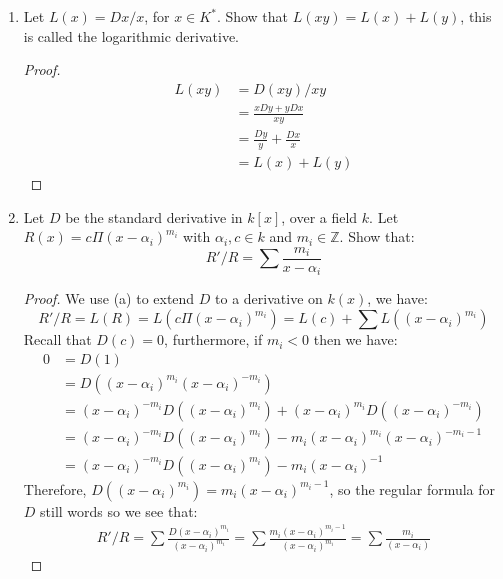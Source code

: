 \documentclass{article}
\newcommand{\Z}{\mathbb{Z}}
\theoremstyle{definition}
\theoremstyle{remark}
\theoremstyle{definition}
\begin{document}
\begin{enumerate}[label={(\alph*)}]
    \item Let $L(x)=Dx/x$, for $x\in K^\ast$. Show that $L(xy) = L(x)+L(y)$, this is called the logarithmic derivative.
    \begin{proof}
        \begin{align}
            L(xy) &= D(xy)/xy\\
                  &= \frac{xDy+yDx}{xy}\\
                  &= \frac{Dy}{y}+\frac{Dx}{x}\\
                  &= L(x)+L(y)
        \end{align}
    \end{proof}
\item Let $D$ be the standard derivative in $k[x]$, over a field $k$. Let $R(x) = c\Pi{(x-\alpha_i)}^{m_i}$ with $\alpha_i,c\in k$ and $m_i\in \Z$.
Show that:\begin{equation}
    R'/R = \sum\frac{m_i}{x-\alpha_i}
\end{equation}
\begin{proof}
    We use (a) to extend $D$ to a derivative on $k(x)$, we have:\begin{equation}
        R'/R = L(R) = L(c\Pi{(x-\alpha_i)}^{m_i}) = L(c)+\sum L({(x-\alpha_i)}^{m_i})
    \end{equation}
Recall that $D(c) = 0$, furthermore, if $m_i<0$ then we have:\begin{align}
    0 &= D(1)\\
    &= D({(x-\alpha_i)}^{m_i}{(x-\alpha_i)}^{-m_i})\\
    &= {(x-\alpha_i)}^{-m_i}D({(x-\alpha_i)}^{m_i})+{(x-\alpha_i)}^{m_i}D({(x-\alpha_i)}^{-m_i})\\
    &= {(x-\alpha_i)}^{-m_i}D({(x-\alpha_i)}^{m_i})-m_i{(x-\alpha_i)}^{m_i}{(x-\alpha_i)}^{-m_i-1}\\
    &= {(x-\alpha_i)}^{-m_i}D({(x-\alpha_i)}^{m_i})-m_i{(x-\alpha_i)}^{-1}
\end{align}
Therefore, $D({(x-\alpha_i)}^{m_i}) = m_i{(x-\alpha_i)}^{m_i-1}$, so the regular formula for $D$ still words so we see that:\begin{align}
    R'/R = \sum \frac{D{(x-\alpha_i)}^{m_i}}{{(x-\alpha_i)}^{m_i}} = \sum \frac{m_i{(x-\alpha_i)}^{m_i-1}}{{(x-\alpha_i)}^{m_i}} = \sum \frac{m_i}{{(x-\alpha_i)}}
\end{align}
\end{proof}
\end{enumerate}

    
\end{document}
